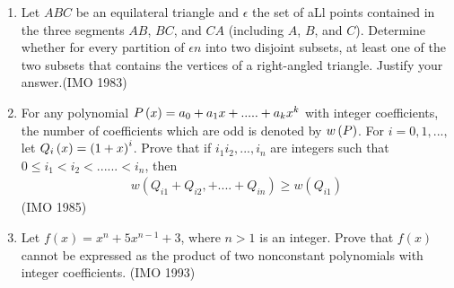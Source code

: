 \begin{enumerate}
\item Let $ABC$ be an equilateral triangle and $\epsilon$ the set of aLl points contained in the three segments $AB$, $BC$, and $CA$ (including $A$, $B$, and $C$). Determine whether for every partition of $\epsilon n$ into two disjoint subsets, at least one of the two subsets that contains the vertices of a right-angled triangle. Justify your answer.\hfill(IMO 1983)

	\item For any polynomial $P\left(x\right) = a_0 + a_1x + ..... + a_kx^k$ with integer coefficients,  the number of coefficients which are odd is denoted by $w\left(P\right)$.  For $i = 0, 1, ..., $let $Q_i\left(x\right) = \left(1+x\right)^i$. Prove that if $i_1i_2, ..., i_n$ are integers such that  $0\leq i_1<i_2<......<i_n$, then \begin{align*}  w (Q_{i1}+Q_{i2},+....+Q_{in})\geq w (Q_{i1}) \end{align*}\hfill(IMO 1985)                                     
\item Let $f(x)=x^{n}+5x^{n-1}+3$, where $n>1$ is an integer. Prove that $f(x)$ cannot be expressed as the product of two nonconstant polynomials with integer coefficients.  \hfill(IMO 1993)
\end{enumerate}
